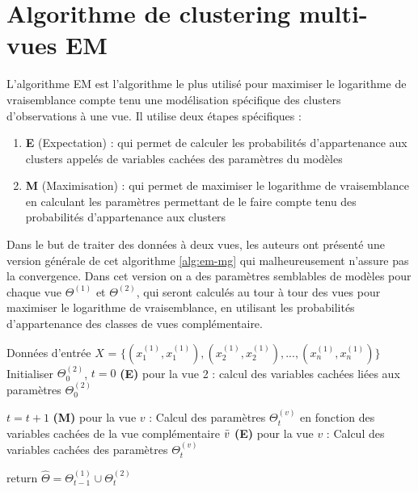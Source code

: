 \documentclass[12pt, french, latin.medieval, a4paper]{report}
\begin{document}
    \section{Algorithme de clustering multi-vues EM}
        L'algorithme EM \cite{dempster1977maximum} est l'algorithme le plus utilisé pour maximiser le logarithme de vraisemblance compte tenu une modélisation spécifique des clusters d'observations à une vue. Il utilise deux étapes spécifiques :
        \begin{enumerate}
            \item \textbf{E} (Expectation) : qui permet de calculer les probabilités d'appartenance aux clusters appelés de variables cachées des paramètres du modèles
            \item \textbf{M} (Maximisation) : qui permet de maximiser le logarithme de vraisemblance en calculant les paramètres permettant de le faire compte tenu des probabilités d'appartenance aux clusters
        \end{enumerate}
    
        Dans le but de traiter des données à deux vues, les auteurs ont présenté une version générale de cet algorithme \ref{alg:em-mg} qui malheureusement n'assure pas la convergence. Dans cet version on a des paramètres semblables de modèles pour chaque vue $\Theta^{(1)}$ et $\Theta^{(2)}$, qui seront calculés au tour à tour des vues pour maximiser le logarithme de vraisemblance, en utilisant les probabilités d'appartenance des classes de vues complémentaire.

        \begin{algorithm}[H]
             \caption{Pseudo code de l'algorithme multi-vues EM \cite{bickel2004multi}}
             \label{alg:em-mg}
             \begin{algorithmic}[1]
              \REQUIRE Données d'entrée $X$ = $\{ (x_{1}^{(1)}, x_{1}^{(1)}), (x_{2}^{(1)}, x_{2}^{(1)}), ..., (x_{n}^{(1)}, x_{n}^{(1)}) \}$
              \STATE Initialiser $\Theta_{0}^{(2)}$, $t=0$
              \STATE \textbf{(E)} pour la vue 2 : calcul des variables cachées liées aux paramètres $\Theta_{0}^{(2)}$

                    \STATE $t = t+1$
                    \STATE \textbf{(M)} pour la vue $v$ : Calcul des paramètres $\Theta_{t}^{(v)}$ en fonction des variables cachées de la vue complémentaire $\Bar{v}$
                    \STATE \textbf{(E)} pour la vue $v$ : Calcul des variables cachées des paramètres $\Theta_{t}^{(v)}$
                \ENDFOR
                 
              \ENDWHILE
              \STATE return $\hat{\Theta} = \Theta_{t-1}^{(1)} \cup \Theta_{t}^{(2)}$
             \end{algorithmic}
        \end{algorithm}
\end{document}
